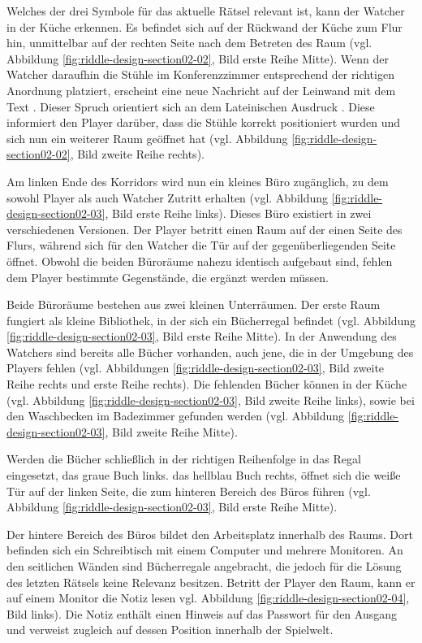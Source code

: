Welches der drei Symbole für das aktuelle Rätsel relevant ist, kann der Watcher in der Küche erkennen. Es befindet sich auf der Rückwand der Küche zum Flur hin, unmittelbar auf der rechten Seite nach dem Betreten des Raum (vgl. Abbildung \ref{fig:riddle-design-section02-02}, Bild erste Reihe Mitte). Wenn der Watcher daraufhin die Stühle im Konferenzzimmer entsprechend der richtigen Anordnung platziert, erscheint eine neue Nachricht auf der Leinwand mit dem Text . Dieser Spruch orientiert sich an dem Lateinischen Ausdruck . Diese informiert den Player darüber, dass die Stühle korrekt positioniert wurden und sich nun ein weiterer Raum geöffnet hat (vgl. Abbildung \ref{fig:riddle-design-section02-02}, Bild zweite Reihe rechts).

Am linken Ende des Korridors wird nun ein kleines Büro zugänglich, zu dem sowohl Player als auch Watcher Zutritt erhalten (vgl. Abbildung \ref{fig:riddle-design-section02-03}, Bild erste Reihe links). Dieses Büro existiert in zwei verschiedenen Versionen. Der Player betritt einen Raum auf der einen Seite des Flurs, während sich für den Watcher die Tür auf der gegenüberliegenden Seite öffnet. Obwohl die beiden Büroräume nahezu identisch aufgebaut sind, fehlen dem Player bestimmte Gegenstände, die ergänzt werden müssen.

Beide Büroräume bestehen aus zwei kleinen Unterräumen. Der erste Raum fungiert als kleine Bibliothek, in der sich ein Bücherregal befindet (vgl. Abbildung \ref{fig:riddle-design-section02-03}, Bild erste Reihe Mitte). In der Anwendung des Watchers sind bereits alle Bücher vorhanden, auch jene, die in der Umgebung des Players fehlen (vgl. Abbildungen \ref{fig:riddle-design-section02-03}, Bild zweite Reihe rechts und erste Reihe rechts). Die fehlenden Bücher können in der Küche (vgl. Abbildung \ref{fig:riddle-design-section02-03}, Bild zweite Reihe links), sowie bei den Waschbecken im Badezimmer gefunden werden (vgl. Abbildung \ref{fig:riddle-design-section02-03}, Bild zweite Reihe Mitte).

Werden die Bücher schließlich in der richtigen Reihenfolge in das Regal eingesetzt, das graue Buch links. das hellblau Buch rechts, öffnet sich die weiße Tür auf der linken Seite, die zum hinteren Bereich des Büros führen (vgl. Abbildung \ref{fig:riddle-design-section02-03}, Bild erste Reihe Mitte).

Der hintere Bereich des Büros bildet den Arbeitsplatz innerhalb des Raums. Dort befinden sich ein Schreibtisch mit einem Computer und mehrere Monitoren. An den seitlichen Wänden sind Bücherregale angebracht, die jedoch für die Lösung des letzten Rätsels keine Relevanz besitzen. Betritt der Player den Raum, kann er auf einem Monitor die Notiz  lesen vgl. Abbildung \ref{fig:riddle-design-section02-04}, Bild links). Die Notiz enthält einen Hinweis auf das Passwort für den Ausgang und verweist zugleich auf dessen Position innerhalb der Spielwelt.

